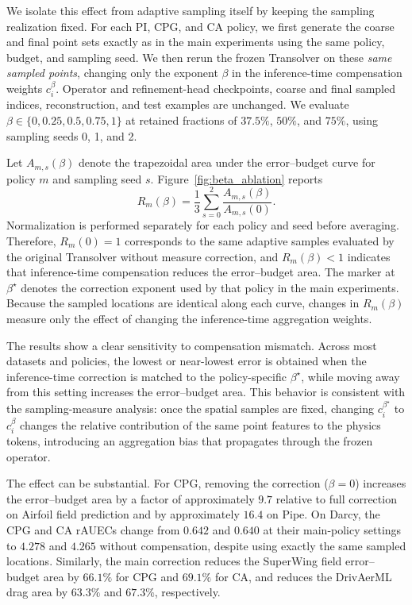 We isolate this effect from adaptive sampling itself by keeping the
sampling realization fixed. For each PI, CPG, and CA policy, we first
generate the coarse and final point sets exactly as in the main
experiments using the same policy, budget, and sampling seed. We then
rerun the frozen Transolver on these \emph{same sampled points}, changing
only the exponent $\beta$ in the inference-time compensation weights
$c_i^\beta$. Operator and refinement-head checkpoints, coarse and final
sampled indices, reconstruction, and test examples are unchanged.
We evaluate
$\beta\in\{0,0.25,0.5,0.75,1\}$
at retained fractions of $37.5\%$, $50\%$, and $75\%$, using sampling
seeds 0, 1, and 2.

Let $A_{m,s}(\beta)$ denote the trapezoidal area under the error--budget
curve for policy $m$ and sampling seed $s$. Figure~\ref{fig:beta_ablation}
reports
\begin{equation}
    R_m(\beta)
    =
    \frac{1}{3}
    \sum_{s=0}^{2}
    \frac{A_{m,s}(\beta)}
         {A_{m,s}(0)}.
    \label{eq:beta_relative_area}
\end{equation}
Normalization is performed separately for each policy and seed before
averaging. Therefore, $R_m(0)=1$ corresponds to the same adaptive
samples evaluated by the original Transolver without measure correction,
and $R_m(\beta)<1$ indicates that inference-time compensation reduces
the error--budget area. The marker at $\beta^\star$ denotes the
correction exponent used by that policy in the main experiments.
Because the sampled locations are identical along each curve, changes in
$R_m(\beta)$ measure only the effect of changing the inference-time
aggregation weights.



The results show a clear sensitivity to compensation mismatch.
Across most datasets and policies, the lowest or near-lowest error is
obtained when the inference-time correction is matched to the
policy-specific $\beta^\star$, while moving away from this setting
increases the error--budget area. This behavior is consistent with the
sampling-measure analysis: once the spatial samples are fixed, changing
$c_i^{\beta^\star}$ to $c_i^\beta$ changes the relative contribution of
the same point features to the physics tokens, introducing an aggregation
bias that propagates through the frozen operator.

The effect can be substantial. For CPG, removing the correction
($\beta=0$) increases the error--budget area by a factor of approximately
$9.7$ relative to full correction on Airfoil field prediction and by
approximately $16.4$ on Pipe. On Darcy, the CPG and CA rAUECs change from
$0.642$ and $0.640$ at their main-policy settings to $4.278$ and $4.265$
without compensation, despite using exactly the same sampled locations.
Similarly, the main correction reduces the SuperWing field
error--budget area by $66.1\%$ for CPG and $69.1\%$ for CA, and reduces
the DrivAerML drag area by $63.3\%$ and $67.3\%$, respectively.

